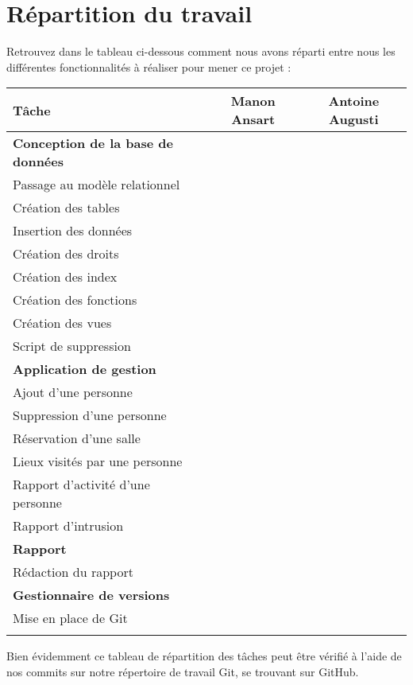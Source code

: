 \section{Répartition du travail}
Retrouvez dans le tableau ci-dessous comment nous avons réparti entre nous les différentes fonctionnalités à réaliser pour mener ce projet : 
\begin{center}
	\begin{tabular}
	{| l ||	c |	c |} \hline
		Tâche & Manon Ansart & Antoine Augusti \\ \hline \hline
		\textbf{Conception de la base de données} & & \\ \hline
		Passage au modèle relationnel & \checkmark & \checkmark \\ \hline
		Création des tables & & \checkmark \\ \hline
		Insertion des données & \checkmark &  \\ \hline
		Création des droits & \checkmark &  \\ \hline
		Création des index & & \checkmark \\ \hline
		Création des fonctions & \checkmark &  \\ \hline
		Création des vues & & \checkmark \\ \hline
		Script de suppression & \checkmark &  \\ \hline
		\hlineGras 
		\textbf{Application de gestion} & & \\ \hline
		Ajout d'une personne & \checkmark &  \\ \hline
		Suppression d'une personne & \checkmark &  \\ \hline
		Réservation d'une salle & & \checkmark \\ \hline
		Lieux visités par une personne & \checkmark &  \\ \hline
		Rapport d'activité d'une personne & & \checkmark \\ \hline
		Rapport d'intrusion & & \checkmark \\ \hline
		\hlineGras 
		\textbf{Rapport} & & \\ \hline
		Rédaction du rapport & \checkmark & \checkmark \\ \hline
		\hlineGras 
		\textbf{Gestionnaire de versions} & & \\ \hline
		Mise en place de Git &  & \checkmark \\ \hline
		\hlineGras 
	\end{tabular}
\end{center}
Bien évidemment ce tableau de répartition des tâches peut être vérifié à l'aide de nos commits sur notre répertoire de travail Git, se trouvant sur GitHub.

